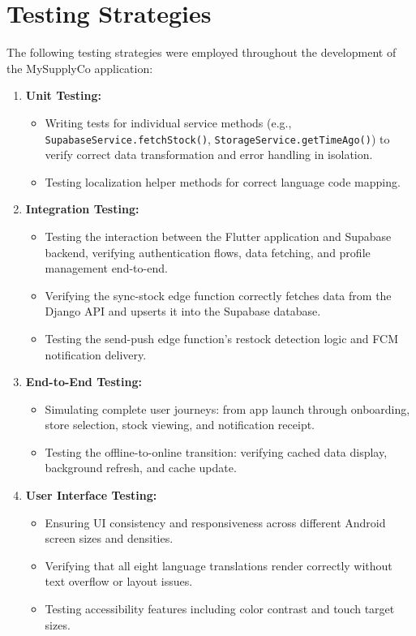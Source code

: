 \section{Testing Strategies}

The following testing strategies were employed throughout the development of the MySupplyCo application:

\begin{enumerate}
    \item \textbf{Unit Testing:}
    \begin{itemize}
        \item Writing tests for individual service methods (e.g., \newline \texttt{SupabaseService.fetchStock()}, \texttt{StorageService.getTimeAgo()}) to verify correct data transformation and error handling in isolation.
        \item Testing localization helper methods for correct language code mapping.
    \end{itemize}

    \item \textbf{Integration Testing:}
    \begin{itemize}
        \item Testing the interaction between the Flutter application and Supabase backend, verifying authentication flows, data fetching, and profile management end-to-end.
        \item Verifying the sync-stock edge function correctly fetches data from the Django API and upserts it into the Supabase database.
        \item Testing the send-push edge function's restock detection logic and FCM notification delivery.
    \end{itemize}

    \item \textbf{End-to-End Testing:}
    \begin{itemize}
        \item Simulating complete user journeys: from app launch through onboarding, store selection, stock viewing, and notification receipt.
        \item Testing the offline-to-online transition: verifying cached data display, background refresh, and cache update.
    \end{itemize}

    \item \textbf{User Interface Testing:}
    \begin{itemize}
        \item Ensuring UI consistency and responsiveness across different Android screen sizes and densities.
        \item Verifying that all eight language translations render correctly without text overflow or layout issues.
        \item Testing accessibility features including color contrast and touch target sizes.
    \end{itemize}


\end{enumerate}
